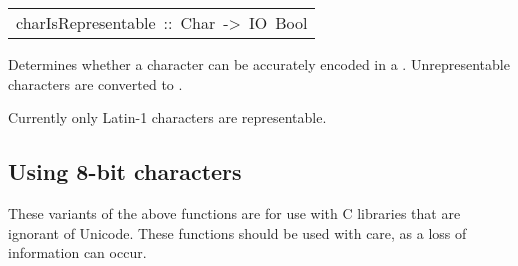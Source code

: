 \begin{haddockdesc}
\item[\begin{tabular}{@{}l}
charIsRepresentable\ ::\ Char\ ->\ IO\ Bool
\end{tabular}]\haddockbegindoc
Determines whether a character can be accurately encoded in a .
 Unrepresentable characters are converted to .
\par
Currently only Latin-1 characters are representable.
\par

\end{haddockdesc}
\subsection{Using 8-bit characters
}
These variants of the above functions are for use with C libraries
 that are ignorant of Unicode.  These functions should be used with
 care, as a loss of information can occur.
\par

